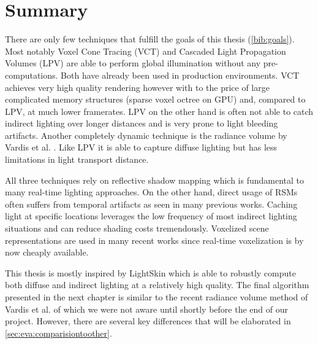 \documentclass[thesis.tex]{subfiles}
\begin{document}
\section{Summary} %
There are only few techniques that fulfill the goals of this thesis (\autoref{bib:goals}).
Most notably Voxel Cone Tracing \cite{bib:voxelgi} (VCT) and Cascaded Light Propagation Volumes \cite{bib:lpt} (LPV) are able to perform global illumination without any pre-computations.
Both have already been used in production environments. %
VCT achieves very high quality rendering however with to the price of large complicated memory structures (sparse voxel octree on GPU) and, compared to LPV, at much lower framerates.
LPV on the other hand is often not able to catch indirect lighting over longer distances and is very prone to light bleeding artifacts.
Another completely dynamic technique is the radiance volume by Vardis et al. \cite{bib:radiancecachechromaticcompression}.
Like LPV it is able to capture diffuse lighting but has less limitations in light transport distance.

All three techniques rely on reflective shadow mapping which is fundamental to many real-time lighting approaches.
On the other hand, direct usage of RSMs often suffers from temporal artifacts as seen in many previous works.
Caching light at specific locations leverages the low frequency of most indirect lighting situations and can reduce shading costs tremendously.
Voxelized scene representations are used in many recent works since real-time voxelization is by now cheaply available.

This thesis is mostly inspired by LightSkin \cite{bib:LightskinPaper} which is able to robustly compute both diffuse and indirect lighting at a relatively high quality.
The final algorithm presented in the next chapter is similar to the recent radiance volume method of Vardis et al. \cite{bib:radiancecachechromaticcompression} of which we were not aware until shortly before the end of our project.
However, there are several key differences that will be elaborated in \autoref{sec:eva:comparisiontoother}.


\subfilebib %
\end{document}
